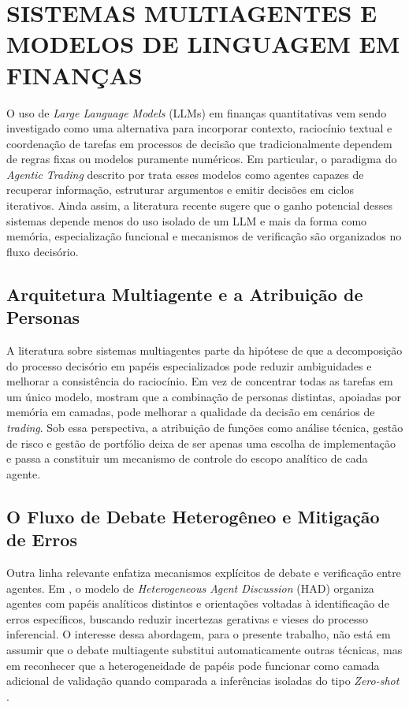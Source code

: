 \documentclass{eic-bcc-tcc}
\begin{document}
\section{SISTEMAS MULTIAGENTES E MODELOS DE LINGUAGEM EM FINANÇAS}

O uso de \textit{Large Language Models} (LLMs) em finanças quantitativas vem sendo investigado como uma alternativa para incorporar contexto, raciocínio textual e coordenação de tarefas em processos de decisão que tradicionalmente dependem de regras fixas ou modelos puramente numéricos. Em particular, o paradigma do \textit{Agentic Trading} descrito por \citet[p. 1]{Xia2026} trata esses modelos como agentes capazes de recuperar informação, estruturar argumentos e emitir decisões em ciclos iterativos. Ainda assim, a literatura recente sugere que o ganho potencial desses sistemas depende menos do uso isolado de um LLM e mais da forma como memória, especialização funcional e mecanismos de verificação são organizados no fluxo decisório.

\subsection{Arquitetura Multiagente e a Atribuição de Personas}

A literatura sobre sistemas multiagentes parte da hipótese de que a decomposição do processo decisório em papéis especializados pode reduzir ambiguidades e melhorar a consistência do raciocínio. Em vez de concentrar todas as tarefas em um único modelo, \citet[p. 1]{Li2023} mostram que a combinação de personas distintas, apoiadas por memória em camadas, pode melhorar a qualidade da decisão em cenários de \textit{trading}. Sob essa perspectiva, a atribuição de funções como análise técnica, gestão de risco e gestão de portfólio deixa de ser apenas uma escolha de implementação e passa a constituir um mecanismo de controle do escopo analítico de cada agente.

\subsection{O Fluxo de Debate Heterogêneo e Mitigação de Erros}

Outra linha relevante enfatiza mecanismos explícitos de debate e verificação entre agentes. Em \citet{Xing2024}, o modelo de \textit{Heterogeneous Agent Discussion} (HAD) organiza agentes com papéis analíticos distintos e orientações voltadas à identificação de erros específicos, buscando reduzir incertezas gerativas e vieses do processo inferencial. O interesse dessa abordagem, para o presente trabalho, não está em assumir que o debate multiagente substitui automaticamente outras técnicas, mas em reconhecer que a heterogeneidade de papéis pode funcionar como camada adicional de validação quando comparada a inferências isoladas do tipo \textit{Zero-shot} \citep[p. 5, p. 9]{Xing2024}.
\end{document}
